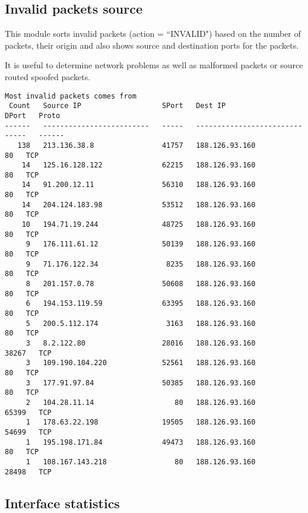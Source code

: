 \documentclass[english,twoside,openright,a4paper,12pt]{article}
\begin{document}
\subsection{Invalid packets source}

This module sorts invalid packets (action = ``INVALID") based on the
number of packets, their origin and also shows source and destination
ports for the packets.

It is useful to determine network problems as well as malformed
packets or source routed spoofed packets.

\scriptsize \begin{verbatim}Most invalid packets comes from
 Count   Source IP                   SPort   Dest IP                     DPort   Proto    
------   -------------------------   -----   -------------------------   -----   ------   
   138   213.136.38.8                41757   188.126.93.160                 80   TCP      
    14   125.16.128.122              62215   188.126.93.160                 80   TCP      
    14   91.200.12.11                56310   188.126.93.160                 80   TCP      
    14   204.124.183.98              53512   188.126.93.160                 80   TCP      
    10   194.71.19.244               48725   188.126.93.160                 80   TCP      
     9   176.111.61.12               50139   188.126.93.160                 80   TCP      
     9   71.176.122.34                8235   188.126.93.160                 80   TCP      
     8   201.157.0.78                50608   188.126.93.160                 80   TCP      
     6   194.153.119.59              63395   188.126.93.160                 80   TCP      
     5   200.5.112.174                3163   188.126.93.160                 80   TCP      
     3   8.2.122.80                  28016   188.126.93.160              38267   TCP      
     3   109.190.104.220             52561   188.126.93.160                 80   TCP      
     3   177.91.97.84                50385   188.126.93.160                 80   TCP      
     2   104.28.11.14                   80   188.126.93.160              65399   TCP      
     1   178.63.22.198               19505   188.126.93.160              54699   TCP      
     1   195.198.171.84              49473   188.126.93.160                 80   TCP      
     1   108.167.143.218                80   188.126.93.160              28498   TCP      
\end{verbatim} \normalsize

\subsection{Interface statistics}
\end{document}
